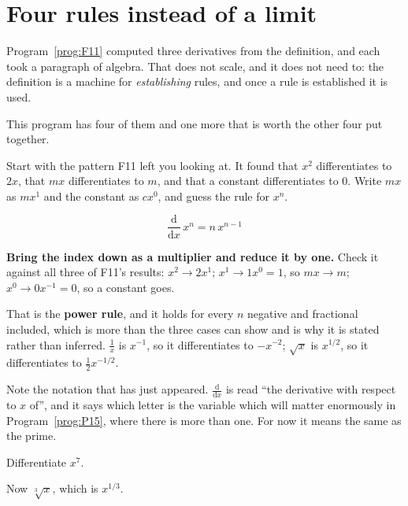 \section{Four rules instead of a limit}
\label{sec:F12-rules}

\begin{fr}
Program~\ref{prog:F11} computed three derivatives from the definition, and
each took a paragraph of algebra. That does not scale, and it does not need
to: the definition is a machine for \emph{establishing} rules, and once a rule
is established it is used.

This program has four of them and one more that is worth the other four put
together.

Start with the pattern F11 left you looking at. It found that $x^{2}$
differentiates to $2x$, that $mx$ differentiates to $m$, and that a constant
differentiates to $0$. Write $mx$ as $mx^{1}$ and the constant as $cx^{0}$,
and guess the rule for $x^{n}$.
\dotline
\nextframe
\end{fr}

\begin{fr}
\begin{ansblock}
\[ \frac{\mathrm{d}}{\mathrm{d}x}\,x^{n} = n\,x^{n-1} \]
\end{ansblock}

\textbf{Bring the index down as a multiplier and reduce it by one.} Check it
against all three of F11's results: $x^{2} \to 2x^{1}$; $x^{1} \to 1x^{0} = 1$,
so $mx \to m$; $x^{0} \to 0x^{-1} = 0$, so a constant goes.

That is the \textbf{power rule}, and it holds for every $n$ \dash{} negative
and fractional included, which is more than the three cases can show and is
why it is stated rather than inferred. $\frac{1}{x}$ is $x^{-1}$, so it
differentiates to $-x^{-2}$; $\sqrt{x}$ is $x^{1/2}$, so it differentiates to
$\frac{1}{2}x^{-1/2}$.

Note the notation that has just appeared. $\frac{\mathrm{d}}{\mathrm{d}x}$ is
read \enquote{the derivative with respect to $x$ of}, and it says which letter
is the variable \dash{} which will matter enormously in
Program~\ref{prog:P15}, where there is more than one. For now it means the
same as the prime.

Differentiate $x^{7}$.
\nextframe
\end{fr}

\begin{fr}
Now $\sqrt[3]{x}$, which is $x^{1/3}$.
\nextframe
\end{fr}

